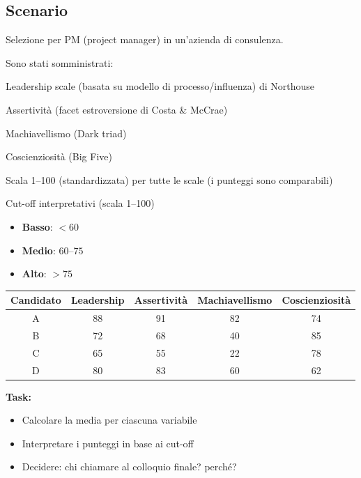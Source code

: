 \documentclass[compress]{beamer}
\begin{document}
\subsection*{Scenario}
\begin{frame}

Selezione per PM (project manager) in un’azienda di consulenza.

Sono stati somministrati:

Leadership scale (basata su modello di processo/influenza) di Northouse

Assertività (facet estroversione di Costa \& McCrae)

Machiavellismo (Dark triad)

Coscienziosità (Big Five)

\vspace{3mm}

Scala 1–100 (standardizzata) per tutte le scale (i punteggi sono comparabili)

\begin{block}{Cut-off interpretativi (scala 1–100)}
	\begin{itemize}
		\item \textbf{Basso}: $< 60$
		\item \textbf{Medio}: $60–75$
		\item \textbf{Alto}: $> 75$
	\end{itemize}
\end{block}
\end{frame}


\begin{frame}
	
	\small
	
	\begin{table}[h]
		\centering
		\begin{tabular}{ccccc}
			\hline
			\textbf{Candidato} & \textbf{Leadership} & \textbf{Assertività} & \textbf{Machiavellismo} & \textbf{Coscienziosità} \\
			\hline
			A & 88 & 91 & 82 & 74 \\
			B & 72 & 68 & 40 & 85 \\
			C & 65 & 55 & 22 & 78 \\
			D & 80 & 83 & 60 & 62 \\
			\hline
		\end{tabular}
	\end{table}
	
	\vspace{0.5cm}
	
	\textbf{Task:}
	\begin{itemize}
		\item Calcolare la media per ciascuna variabile
		\item Interpretare i punteggi in base ai cut-off
		\item Decidere: chi chiamare al colloquio finale? perché?
	\end{itemize}
	
\end{frame}
\end{document}
